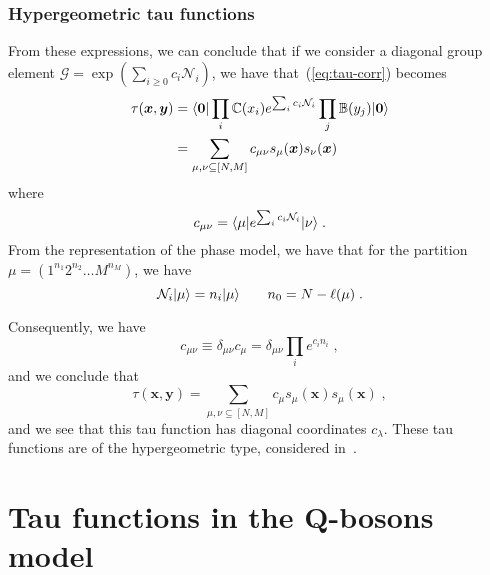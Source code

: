 \documentclass[a4paper,11pt]{amsart}
\begin{document}

\subsubsection{Hypergeometric tau functions}
From these expressions, we can conclude that if we consider a diagonal
group element \(\mathcal{G} = \exp \left( \sum_{i\geq 0} c_i
\mathcal{N}_i\right)\), we have that~(\ref{eq:tau-corr}) becomes
\begin{equation}
\begin{split}
  \tau(\bm{x}, \bm{y}) 
  & = \langle\bm{0}\rvert \prod_{i} \mathbb{C}(x_i)
  e^{\sum_i c_i \mathcal{N}_i} \prod_j \mathbb{B}(y_j) \lvert\bm{0}\rangle\\
  & = \sum_{\mu, \nu \subseteq [N,M]} c_{\mu\nu} s_\mu(\bm{x}) s_\nu(\bm{x})
\end{split}
\end{equation}
where
\begin{equation}
  c_{\mu \nu} = \langle\mu\rvert e^{\sum_i c_i \mathcal{N}_i}\lvert\nu\rangle \; .
\end{equation}
From the representation of the phase model, we have that for the partition
\(\mu = (1^{n_1} 2^{n_2} \dots M^{n_M})\), we have
\begin{equation}
  \mathcal{N}_i \lvert\mu\rangle = n_i \lvert\mu\rangle \qquad n_0 = N - \ell(\mu)\; .
\end{equation}

Consequently, we have
\begin{equation}
  c_{\mu \nu} \equiv \delta_{\mu\nu} c_{\mu}  =  \delta_{\mu\nu} \prod_i e^{c_i n_i}\; , 
\end{equation}
and we conclude that 
\begin{equation}
  \tau(\bm{x}, \bm{y}) 
  = \sum_{\mu, \nu \subseteq [N,M]} c_{\mu} s_\mu(\bm{x}) s_\mu(\bm{x})\; ,
\end{equation}
and we see that this tau function has diagonal coordinates
\(c_\lambda\).  These tau functions are of the hypergeometric type,
considered in~\cite{Orlov:2000, orlov:2001, Orlov:2001b, Orlov:2005}.








\section{Tau functions in the Q-bosons model}
\end{document}
